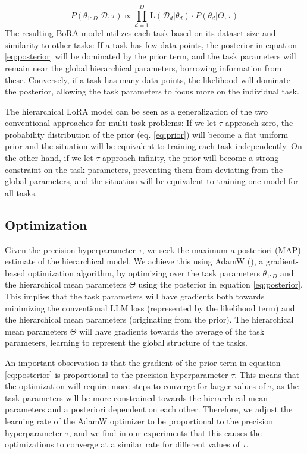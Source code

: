 \documentclass[fullpaper]{nldl}
\begin{document}
\begin{equation} \label{eq:posterior}
    P(\theta_{1:D} | \mathcal{D}, \tau) \propto \prod_{d=1}^D \text{L}(\mathcal{D}_d | \theta_d) \cdot P(\theta_d | \Theta, \tau)
\end{equation}
%
The resulting BoRA model utilizes each task based on its dataset size and similarity to other tasks: If a task has few data points, the posterior in equation \ref{eq:posterior} will be dominated by the prior term, and the task parameters will remain near the global hierarchical parameters, borrowing information from these. Conversely, if a task has many data points, the likelihood will dominate the posterior, allowing the task parameters to focus more on the individual task.

The hierarchical LoRA model can be seen as a generalization of the two conventional approaches for multi-task problems: If we let $\tau$ approach zero, the probability distribution of the prior (eq. \ref{eq:prior}) will become a flat uniform prior and the situation will be equivalent to training each task independently. On the other hand, if we let $\tau$ approach infinity, the prior will become a strong constraint on the task parameters, preventing them from deviating from the global parameters, and the situation will be equivalent to training one model for all tasks.

\subsection{Optimization}
Given the precision hyperparameter $\tau$, we seek the maximum a posteriori (MAP) estimate of the hierarchical model. We achieve this using AdamW (\cite{loshchilovDecoupledWeightDecay2018}), a gradient-based optimization algorithm, by optimizing over the task parameters $\theta_{1:D}$ and the hierarchical mean parameters $\Theta$ using the posterior in equation \ref{eq:posterior}. This implies that the task parameters will have gradients both towards minimizing the conventional LLM loss (represented by the likelihood term) and the hierarchical mean parameters (originating from the prior). The hierarchical mean parameters $\Theta$ will have gradients towards the average of the task parameters, learning to represent the global structure of the tasks.

An important observation is that the gradient of the prior term in equation \ref{eq:posterior} is proportional to the precision hyperparameter $\tau$. This means that the optimization will require more steps to converge for larger values of $\tau$, as the task parameters will be more constrained towards the hierarchical mean parameters and a posteriori dependent on each other. Therefore, we adjust the learning rate of the AdamW optimizer to be proportional to the precision hyperparameter $\tau$, and we find in our experiments that this causes the optimizations to converge at a similar rate for different values of $\tau$.
\end{document}
